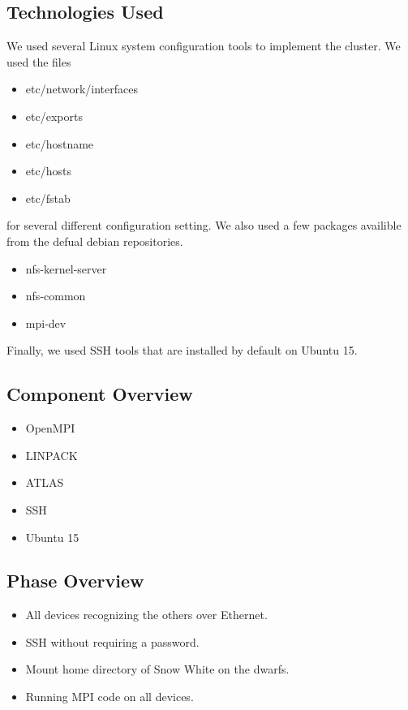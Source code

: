 \subsection{Technologies  Used}
We used several Linux system configuration tools to implement the cluster. We used the files
\begin{itemize}
	\item etc/network/interfaces
	\item etc/exports
	\item etc/hostname
	\item etc/hosts
	\item etc/fstab
\end{itemize}
for several different configuration setting. We also used a few packages availible from the defual debian repositories.
\begin{itemize}
	\item nfs-kernel-server
	\item nfs-common
	\item mpi-dev
\end{itemize}

Finally, we used SSH tools that are installed by default on Ubuntu 15.

\subsection{Component  Overview}
\begin{itemize}
	\item OpenMPI
	\item LINPACK
	\item ATLAS
	\item SSH
	\item Ubuntu 15
\end{itemize}

\subsection{Phase Overview}

\begin{itemize} 
	\item All devices recognizing the others over Ethernet.
	\item SSH without requiring a password.
	\item Mount home directory of Snow White on the dwarfs.
	\item Running MPI code on all devices.
\end{itemize}


